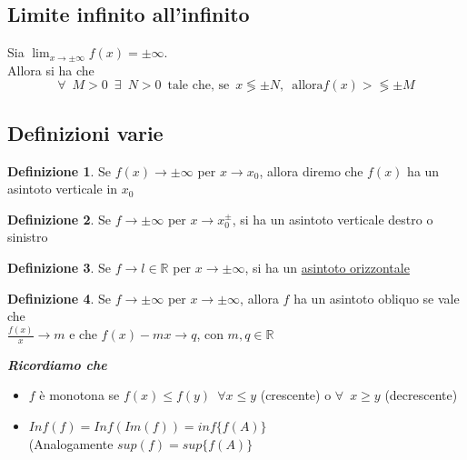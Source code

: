 \documentclass{article}
\theoremstyle{definition}
\newtheorem{definition}{Definizione}
\begin{document}
\subsection{Limite infinito all'infinito}
Sia $\lim_{x \to \pm\infty}f(x)=\pm\infty$.
\\
Allora si ha che
\begin{equation}
    \forall \,\,\, M>0 \,\,\, \exists \,\,\, N>0 \,\,\, \mbox{tale che, se}\,\,\, x  \lessgtr \pm N, \,\,\, \mbox{allora} f(x)> \lessgtr \pm M
\end{equation}

\subsection{Definizioni varie}
\begin{definition}
    Se $f(x) \to \pm\infty$ per $x \to x_0$, allora diremo che $f(x)$ ha un asintoto verticale in $x_0$
\end{definition}
\begin{definition}
    Se $f \to \pm\infty$ per $x \to x_0^\pm$, si ha un asintoto verticale destro o sinistro
\end{definition}
\begin{definition}
    Se $f \to l \in \mathbb{R}$ per $x \to \pm\infty$, si ha un \underline{asintoto orizzontale}
\end{definition}
\begin{definition}
    Se $f \to \pm\infty$ per $x \to \pm\infty$, allora $f$ ha un asintoto obliquo se vale che \\$\frac{f(x)}{x} \to m$ e che $f(x)-mx \to q$, con $m,q \in \mathbb{R}$
\end{definition}
\begin{center}
    \textbf{\textit{Ricordiamo che}}
\end{center}
\begin{itemize}
    \item $f$ è monotona se $f(x) \leqslant f(y) \,\,\, \forall x \leqslant y$ (crescente) o $\forall \,\,\, x \geqslant y$ (decrescente)
    \item $
    Inf(f)=Inf(Im(f))=inf\{f(A)\}$
    \\
    (Analogamente $sup(f)=sup\{f(A)\}$
\end{itemize}
\end{document}
